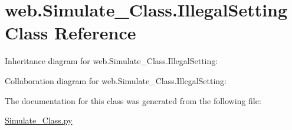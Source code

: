 \hypertarget{classweb_1_1_simulate___class_1_1_illegal_setting}{\section{web.\-Simulate\-\_\-\-Class.\-Illegal\-Setting Class Reference}
\label{classweb_1_1_simulate___class_1_1_illegal_setting}
}


Inheritance diagram for web.\-Simulate\-\_\-\-Class.\-Illegal\-Setting\-:


Collaboration diagram for web.\-Simulate\-\_\-\-Class.\-Illegal\-Setting\-:


The documentation for this class was generated from the following file\-:\begin{DoxyCompactItemize}
\item 
\hyperlink{_simulate___class_8py}{Simulate\-\_\-\-Class.\-py}\end{DoxyCompactItemize}

